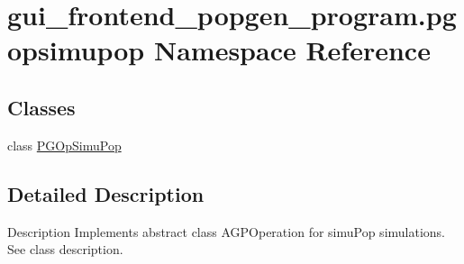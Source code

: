\hypertarget{namespacegui__frontend__popgen__program_1_1pgopsimupop}{}\section{gui\+\_\+frontend\+\_\+popgen\+\_\+program.\+pgopsimupop Namespace Reference}
\label{namespacegui__frontend__popgen__program_1_1pgopsimupop}
\subsection*{Classes}
\begin{DoxyCompactItemize}
\item 
class \hyperlink{classgui__frontend__popgen__program_1_1pgopsimupop_1_1PGOpSimuPop}{P\+G\+Op\+Simu\+Pop}
\end{DoxyCompactItemize}


\subsection{Detailed Description}
\begin{DoxyVerb}Description
Implements abstract class AGPOperation for simuPop simulations.  See class description.
\end{DoxyVerb}
 